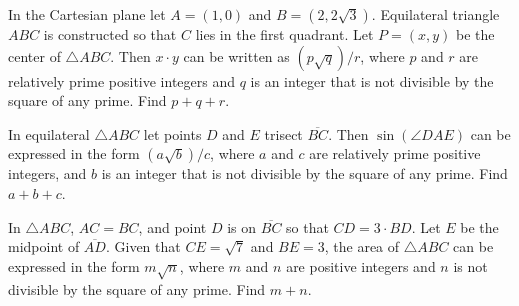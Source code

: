 \documentclass[11pt]{article}
\theoremstyle{definition}
\begin{document}
%	
















\begin{question}[name={2013 AIME II, \href{https://artofproblemsolving.com/community/c4p3003338}{Problem 4}}]
	In the Cartesian plane let $A = (1,0)$ and $B = \left( 2, 2\sqrt{3} \right)$. Equilateral triangle $ABC$ is constructed so that $C$ lies in the first quadrant. Let $P=(x,y)$ be the center of $\triangle ABC$. Then $x \cdot y$ can be written as $(p\sqrt{q})/{r}$, where $p$ and $r$ are relatively prime positive integers and $q$ is an integer that is not divisible by the square of any prime. Find $p+q+r$.
\end{question}


%	













\begin{question}[name={2013 AIME II, \href{https://artofproblemsolving.com/community/c4p3003340}{Problem 5}}]
	In equilateral $\triangle ABC$ let points $D$ and $E$ trisect $\overline{BC}$. Then $\sin \left( \angle DAE \right)$ can be expressed in the form $(a\sqrt{b})/{c}$, where $a$ and $c$ are relatively prime positive integers, and $b$ is an integer that is not divisible by the square of any prime. Find $a+b+c$.	
\end{question}


%	








\begin{question}[name={2013 AIME II, \href{https://artofproblemsolving.com/community/c4p3003350}{Problem 13}}]
	In $\triangle ABC$, $AC = BC$, and point $D$ is on $\overline{BC}$ so that $CD = 3 \cdot BD$. Let $E$ be the midpoint of $\overline{AD}$. Given that $CE = \sqrt{7}$ and $BE = 3$, the area of $\triangle ABC$ can be expressed in the form $m\sqrt{n}$, where $m$ and $n$ are positive integers and $n$ is not divisible by the square of any prime. Find $m+n$.
\end{question}
\end{document}
